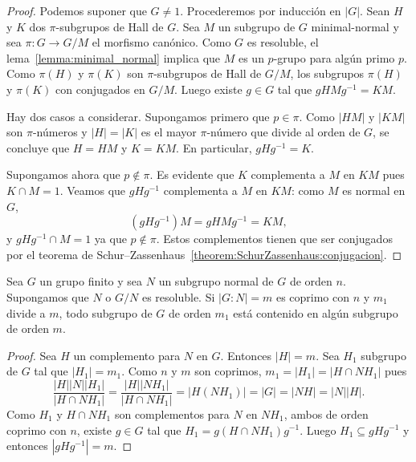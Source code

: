 \begin{proof}
	Podemos suponer que $G\ne1$. Procederemos por inducción en $|G|$.  Sean $H$
	y $K$ dos $\pi$-subgrupos de Hall de $G$. Sea $M$ un subgrupo de $G$
	minimal-normal y sea $\pi\colon G\to G/M$ el morfismo canónico. Como $G$ es
	resoluble, el lema~\ref{lemma:minimal_normal} implica que  $M$ es un
	$p$-grupo para algún primo $p$.  Como $\pi(H)$ y $\pi(K)$ son
	$\pi$-subgrupos de Hall de $G/M$, los subgrupos $\pi(H)$ y $\pi(K)$ con
	conjugados en $G/M$. Luego existe $g\in G$ tal que $gHMg^{-1}=KM$. 

	Hay dos casos a considerar. Supongamos primero que $p\in\pi$. Como $|HM|$ y
	$|KM|$ son $\pi$-números y $|H|=|K|$ es el mayor $\pi$-número que divide al
	orden de $G$, se concluye que $H=HM$ y $K=KM$. En particular, $gHg^{-1}=K$. 

	Supongamos ahora que $p\not\in\pi$. Es evidente que $K$ complementa a $M$ en
	$KM$ pues $K\cap M=1$. Veamos que $gHg^{-1}$ complementa a $M$ en $KM$:
	como $M$ es normal en $G$, 
	\[
	(gHg^{-1})M=gHMg^{-1}=KM,
	\]
	y $gHg^{-1}\cap M=1$ ya que $p\not\in\pi$. Estos complementos tienen que
	ser conjugados por el teorema de
	Schur--Zassenhaus~\ref{theorem:SchurZassenhaus:conjugacion}.
\end{proof}

\begin{corollary}
	Sea $G$ un grupo finito y sea $N$ un subgrupo normal de $G$ de orden $n$.
	Supongamos que $N$ o $G/N$ es resoluble. Si $|G:N|=m$ es coprimo con $n$ y
	$m_1$ divide a $m$, todo subgrupo de $G$ de orden $m_1$ está contenido en
	algún subgrupo de orden $m$.
\end{corollary}

\begin{proof}
	Sea $H$ un complemento para $N$ en $G$. Entonces $|H|=m$. Sea $H_1$
	subgrupo de $G$ tal que $|H_1|=m_1$. 
	Como $n$ y $m$ son coprimos, $m_1=|H_1|=|H\cap NH_1|$ pues
	\[
	\frac{|H||N||H_1|}{|H\cap NH_1|}=
	\frac{|H||NH_1|}{|H\cap NH_1|}=|H(NH_1)|=|G|=|NH|=|N||H|.
	\]
	Como $H_1$ y $H\cap NH_1$ son complementos para $N$ en $NH_1$, ambos de
	orden coprimo con $n$, existe $g\in G$ tal que $H_1=g(H\cap NH_1)g^{-1}$. Luego 
	$H_1\subseteq gHg^{-1}$ y entonces $|gHg^{-1}|=m$. 
\end{proof}

